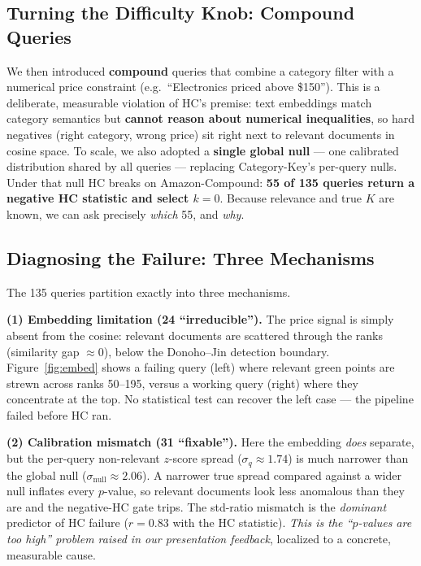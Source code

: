 \documentclass[letterpaper]{article}
\newcommand{\Nfail}{55}
\newcommand{\Nirr}{24}
\newcommand{\Nfix}{31}
\newcommand{\SigQ}{1.74}
\newcommand{\SigNull}{2.06}
\newcommand{\StdR}{0.83}
\begin{document}
\subsection{Turning the Difficulty Knob: Compound Queries}
We then introduced \textbf{compound} queries that combine a category
filter with a numerical price constraint (e.g.\ ``Electronics priced
above \$150''). This is a deliberate, measurable violation of HC's
premise: text embeddings match category semantics but \textbf{cannot
reason about numerical inequalities}, so hard negatives (right
category, wrong price) sit right next to relevant documents in cosine
space. To scale, we also adopted a \textbf{single global null} --- one
calibrated distribution shared by all queries --- replacing
Category-Key's per-query nulls. Under that null HC breaks on
Amazon-Compound: \textbf{\Nfail{} of 135 queries return a negative HC
statistic and select $k\!=\!0$}. Because relevance and true $K$ are
known, we can ask precisely \emph{which} \Nfail{}, and \emph{why}.

\subsection{Diagnosing the Failure: Three Mechanisms}
The 135 queries partition exactly into three mechanisms.

\noindent\textbf{(1) Embedding limitation (\Nirr{} ``irreducible'').}
The price signal is simply absent from the cosine: relevant documents
are scattered through the ranks (similarity gap $\approx 0$), below the
Donoho--Jin detection boundary. Figure~\ref{fig:embed} shows a failing
query (left) where relevant green points are strewn across ranks
50--195, versus a working query (right) where they concentrate at the
top. No statistical test can recover the left case --- the pipeline
failed before HC ran.

\noindent\textbf{(2) Calibration mismatch (\Nfix{} ``fixable'').} Here
the embedding \emph{does} separate, but the per-query non-relevant
$z$-score spread ($\sigma_q\!\approx\!\SigQ$) is much narrower than the
global null ($\sigma_{\mathrm{null}}\!\approx\!\SigNull$). A narrower
true spread compared against a wider null inflates every $p$-value, so
relevant documents look less anomalous than they are and the
negative-HC gate trips. The std-ratio mismatch is the \emph{dominant}
predictor of HC failure ($r\!=\!\StdR$ with the HC statistic). \emph{This
is the ``$p$-values are too high'' problem raised in our presentation
feedback}, localized to a concrete, measurable cause.
\end{document}
